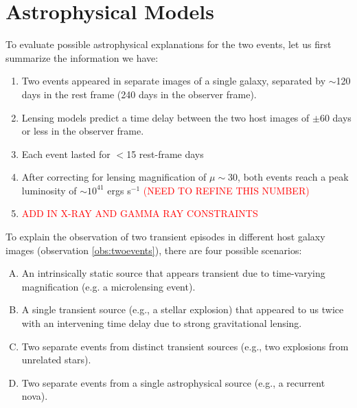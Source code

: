 \section{Astrophysical Models}

To evaluate possible astrophysical explanations for the two \spock
events, let us first summarize the information we have:

\begin{enumerate}
\item{\label{obs:twoevents} Two events appeared in separate images of a single galaxy,
  separated by $\sim$120 days in the rest frame (240 days in the
  observer frame). \label{itm:TwoEvents}}
\item{\label{obs:timedelay} Lensing models predict a time delay between the two host images
  of $\pm60$ days or less in the observer frame.}
\item{\label{obs:timescale} Each event lasted for $<$15 rest-frame days\label{itm:FastLC}}
\item{\label{obs:luminosity} After correcting for lensing magnification of $\mu\sim30$, both
  events reach a peak luminosity of $\sim10^{41}$ ergs s$^{-1}$
  \textcolor{red}{(NEED TO REFINE THIS NUMBER)}}
\item{\label{obs:xray} \textcolor{red}{ADD IN X-RAY AND GAMMA RAY CONSTRAINTS}}
\end{enumerate}


To explain the observation of two transient episodes in different host
galaxy images (observation \ref{obs:twoevents}), there are four possible
scenarios:

\begin{enumerate}[(A)]
\item{\label{case:microlensing} An intrinsically static source that
  appears transient due to time-varying magnification (e.g. a
  microlensing event).}
\item{\label{case:timedelay}A single transient source (e.g., a stellar
  explosion) that appeared to us twice with an intervening time delay
  due to strong gravitational lensing.}
\item{\label{case:twoexplosions} Two separate events from distinct
  transient sources (e.g., two explosions from unrelated stars).}
\item{\label{case:recurrent} Two separate events from a single
  astrophysical source (e.g., a recurrent nova).}
\end{enumerate}



